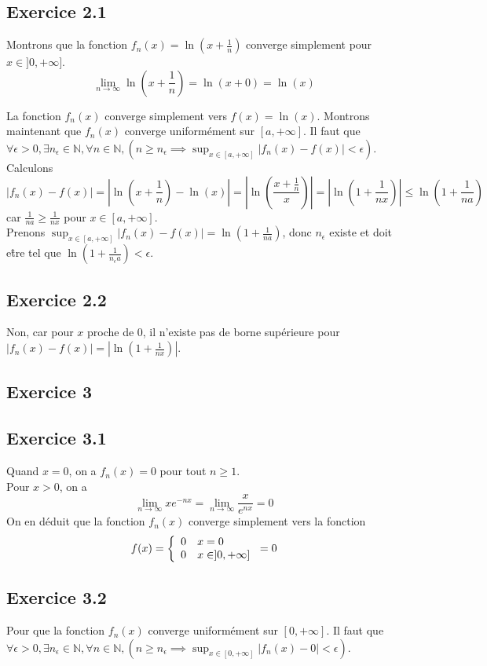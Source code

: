 \documentclass[]{book}
\theoremstyle{definition}
\newcommand{\bb}[1]{\mathbb{#1}}
\newcommand{\N}{\bb{N}}
\begin{document}
\subsection*{Exercice 2.1}
Montrons que la fonction $f_n(x)=\ln\left(x+\frac{1}{n}\right)$ converge simplement pour $x \in ]0,+\infty]$.
$$\lim_{n \to \infty}\ln\left(x+\frac{1}{n}\right) = \ln\left(x+0\right) = \ln(x)$$

La fonction $f_n(x)$ converge simplement vers $f(x) = \ln(x)$. Montrons maintenant que $f_n(x)$ converge uniform\'ement sur $[a,+\infty]$. Il faut que $\forall \epsilon > 0, \exists n_{\epsilon} \in \N, \forall n \in \N, (n \geq n_{\epsilon} \implies \sup_{x \in [a,+\infty]} |f_n(x)-f(x)| < \epsilon)$.
Calculons 
$$|f_n(x)-f(x)| = \left|\ln\left(x+\frac{1}{n}\right) - \ln(x)\right| = \left|\ln\left(\frac{x+\frac{1}{n}}{x}\right)\right| = \left|\ln\left(1 + \frac{1}{nx}\right)\right| \leq \ln\left(1 + \frac{1}{na}\right)$$
car $\frac{1}{na} \geq \frac{1}{nx}$ pour $x \in [a,+\infty]$.\\ 
Prenons $\sup_{x \in [a,+\infty]} |f_n(x)-f(x)| = \ln\left(1 + \frac{1}{na}\right)$, donc $n_{\epsilon}$ existe et doit e\^tre tel que $\ln\left(1 + \frac{1}{n_{\epsilon}a}\right) < \epsilon$.

\subsection*{Exercice 2.2}
Non, car pour $x$ proche de 0, il n'existe pas de borne sup\'erieure pour $|f_n(x)-f(x)| = \left|\ln\left(1 + \frac{1}{nx}\right)\right|$.

\subsection*{Exercice 3}
\subsection*{Exercice 3.1}
Quand $x=0$, on a $f_n(x) = 0$ pour tout $n \geq 1$.\\
Pour $x>0$, on a 
$$\lim_{n \to \infty} xe^{-nx} = \lim_{n \to \infty} \frac{x}{e^{nx}} = 0$$
On en d\'eduit que la fonction $f_n(x)$ converge simplement vers la fonction 
$$f(x) = 
\left\{
\begin{array}{l l}
0 & x = 0\\
0 & x \in ]0, +\infty]\\
\end{array}
\right. 
= 0
$$

\subsection*{Exercice 3.2}
Pour que la fonction $f_n(x)$ converge uniform\'ement sur $[0,+\infty]$. Il faut que $\forall \epsilon > 0, \exists n_{\epsilon} \in \N, \forall n \in \N, (n \geq n_{\epsilon} \implies \sup_{x \in [0,+\infty]} |f_n(x)-0| < \epsilon)$. \\
\end{document}
